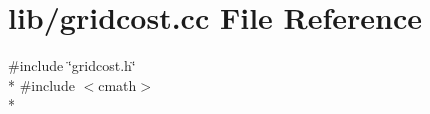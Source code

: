 \section{lib/gridcost.cc File Reference}
\label{lib_2gridcost_8cc}
{\ttfamily \#include \char`\"{}gridcost.\-h\char`\"{}}\\*
{\ttfamily \#include $<$cmath$>$}\\*

